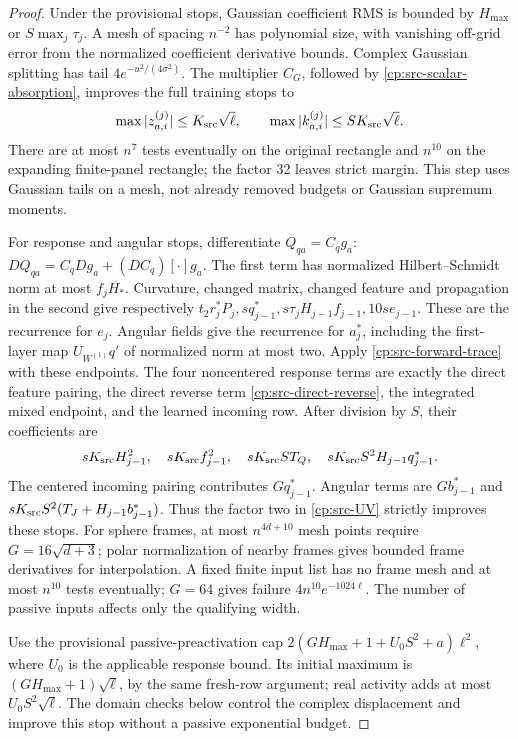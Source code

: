 \begin{proof}
Under the provisional stops, Gaussian coefficient RMS is bounded by
\(H_{\max}\) or \(S\max_j\tau_j\).  A mesh of spacing \(n^{-2}\)
has polynomial size, with vanishing off-grid error from the normalized
coefficient derivative bounds.  Complex Gaussian splitting has tail
\(4e^{-u^2/(4\sigma^2)}\).  The multiplier \(C_G\), followed by
\eqref{cp:src-scalar-absorption}, improves the full training stops to
\begin{equation}
 \max|z_{a,i}^{(j)}|\le K_{\rm src}\sqrt\ell,
 \qquad\max|k_{a,i}^{(j)}|\le SK_{\rm src}\sqrt\ell.
 \label{cp:src-improved-maxima}
\end{equation}
There are at most \(n^7\) tests eventually on the original rectangle
and \(n^{10}\) on the expanding finite-panel rectangle; the factor
32 leaves strict margin.  This step uses Gaussian tails on a mesh,
not already removed budgets or Gaussian supremum moments.

For response and angular stops, differentiate \(Q_{qa}=C_qg_a\):
\(DQ_{qa}=C_qDg_a+(DC_q)[\cdot]g_a\).
The first term has normalized Hilbert--Schmidt norm at most \(f_jH_*\).
Curvature, changed matrix, changed feature and propagation in the
second give respectively
\(t_2r_j^*P_j,sq_{j-1}^*,s\tau_jH_{j-1}f_{j-1},10se_{j-1}\).
These are the recurrence for \(e_j\).  Angular fields give the
recurrence for \(a_j^*\), including the first-layer map
\(U_{W^{(1)}}q'\) of normalized norm at most two.
Apply \eqref{cp:src-forward-trace} with these endpoints.  The four
noncentered response terms are exactly the direct feature pairing,
the direct reverse term \eqref{cp:src-direct-reverse}, the integrated
mixed endpoint, and the learned incoming row.  After division by \(S\),
their coefficients are
\[
 sK_{\rm src}H_{j-1}^2,\quad sK_{\rm src}f_{j-1}^2,\quad
 sK_{\rm src}ST_Q,\quad sK_{\rm src}S^2H_{j-1}q_{j-1}^*.
\]
The centered incoming pairing contributes \(Gq_{j-1}^*\).
Angular terms are \(Gb_{j-1}^*\) and
\(sK_{\rm src}S^2(T_J+H_{j-1}b_{j-1}^*)\).
Thus the factor two in \eqref{cp:src-UV} strictly improves these stops.
For sphere frames, at most \(n^{4d+10}\) mesh points require
\(G=16\sqrt{d+3}\); polar normalization of nearby frames gives
bounded frame derivatives for interpolation.  A fixed finite input
list has no frame mesh and at most \(n^{10}\) tests eventually;
\(G=64\) gives failure \(4n^{10}e^{-1024\ell}\).
The number of passive inputs affects only the qualifying width.

Use the provisional passive-preactivation cap
\(2(GH_{\max}+1+U_0S^2+a)\ell^2\), where \(U_0\) is the
applicable response bound.  Its initial maximum is
\((GH_{\max}+1)\sqrt\ell\), by the same fresh-row argument;
real activity adds at most \(U_0S^2\sqrt\ell\).
The domain checks below control the complex displacement and improve
this stop without a passive exponential budget.


\end{proof}

